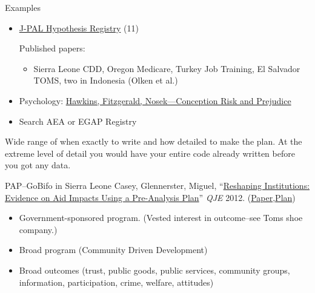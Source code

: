 \documentclass{beamer}
\begin{document}
\begin{frame}{Examples}

\begin{itemize}[<.->]
\item
\href{http://www.povertyactionlab.org/Hypothesis-Registry}{J-PAL Hypothesis Registry} (11) 

Published papers:
\begin{itemize}[<.->]
\item
 Sierra Leone CDD, Oregon Medicare, Turkey Job Training, El Salvador TOMS, two in Indonesia (Olken et al.)
\end{itemize}
\item Psychology: \href{http://pss.sagepub.com/content/26/2/249}{Hawkins, Fitzgerald, Nosek---Conception Risk and Prejudice}
\item Search AEA or EGAP Registry
\end{itemize} 
\vspace{0.25in}
Wide range of when exactly to write and how detailed to make the plan. At the extreme level of detail you would have your entire code already written before you got any data.
\end{frame}

\begin{frame}{PAP--GoBifo in Sierra Leone}
Casey, Glennerster, Miguel, ``\href{http://www.nber.org/data-appendix/w17012/GBF_Supplementary_Appendix_2011-10-07.pdf}{Reshaping Institutions: Evidence on Aid Impacts Using a Pre-Analysis Plan}'' \textit{QJE} 2012. (\href{http://http://eml.berkeley.edu/~emiguel/pdfs/miguel_gbf.pdf}{Paper},\href{http://www.nber.org/data-appendix/w17012/GBF_Supplementary_Appendix_2011-10-07.pdf}{Plan})
\begin{itemize}[<.->]
 \item Government-sponsored program. (Vested interest in outcome--see Toms shoe company.)
 \item Broad program (Community Driven Development)
 \item Broad outcomes (trust, public goods, public services, community groups, information, participation, crime, welfare, attitudes)
\end{itemize} 
\end{frame}
\end{document}
